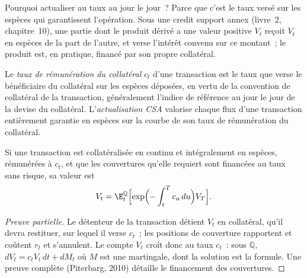 Pourquoi actualiser au taux au jour le jour~? Parce que c'est le taux versé sur les espèces
qui garantissent l'opération. Sous une credit support annex (livre~2,
chapitre~10), une partie dont le produit dérivé a une valeur positive $V_t$ reçoit
$V_t$ en espèces de la part de l'autre, et verse l'intérêt convenu sur ce montant~; le
produit est, en pratique, financé par son propre collatéral.

\begin{definition}\label{def:rc:multi-curve-and-collateral-discounting:csa}
Le \emph{taux de rémunération du collatéral} $c_t$ d'une transaction est le taux
que verse le bénéficiaire du collatéral sur les espèces déposées, en vertu de la convention de collatéral de la transaction,
généralement l'indice de référence au jour le jour de la devise du collatéral.
L'\emph{actualisation CSA} valorise chaque flux d'une transaction entièrement
garantie en espèces sur la courbe de son taux de rémunération du collatéral.
\end{definition}

\begin{proposition}\label{prop:rc:multi-curve-and-collateral-discounting:csa}
Si une transaction est collatéralisée en continu et intégralement en espèces, rémunérées à $c_t$, et
que les couvertures qu'elle requiert sont financées au taux sans risque, sa valeur est
\[
V_t = \E^{\mathbb Q}_t\Bigl[\exp\Bigl(-\int_t^T c_u\,du\Bigr)V_T\Bigr].
\]
\end{proposition}
\begin{proof}[Preuve partielle]
Le détenteur de la transaction détient $V_t$ en collatéral, qu'il devra restituer, sur lequel il verse
$c_t$~; les positions de couverture rapportent et coûtent $r_t$ et s'annulent. Le compte
$V_t$ croît donc au taux $c_t$~: sous $\mathbb Q$, $dV_t = c_tV_t\,dt +
dM_t$ où $M$ est une martingale, dont la solution est la formule. Une preuve complète
(Piterbarg, 2010) détaille le financement des couvertures.
\end{proof}


